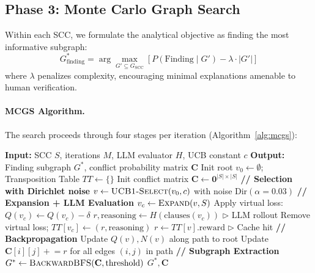 \documentclass{article}
\begin{document}
\subsection{Phase 3: Monte Carlo Graph Search}

Within each SCC, we formulate the analytical objective as finding the most informative subgraph:
\begin{equation}
    G^*_{\text{finding}} = \arg\max_{G' \subseteq G_{\text{SCC}}} \left[ P(\text{Finding} \mid G') - \lambda \cdot |G'| \right]
\end{equation}
where $\lambda$ penalizes complexity, encouraging minimal explanations amenable to human verification.

\paragraph{MCGS Algorithm.} The search proceeds through four stages per iteration (Algorithm~\ref{alg:mcgs}):

\begin{algorithm}[t]
\caption{SA-MCGS: AlphaGo-Style Search for Structural Analysis}
\label{alg:mcgs}
\begin{algorithmic}[1]
\STATE \textbf{Input:} SCC $S$, iterations $M$, LLM evaluator $H$, UCB constant $c$
\STATE \textbf{Output:} Finding subgraph $G^*$, conflict probability matrix $\mathbf{C}$
\STATE Init root $v_0 \leftarrow \emptyset$; Transposition Table $TT \leftarrow \{\}$
\STATE Init conflict matrix $\mathbf{C} \leftarrow \mathbf{0}^{|S| \times |S|}$
    \STATE \textbf{// Selection with Dirichlet noise}
    \STATE $v \leftarrow \textsc{UCB1-Select}(v_0, c)$ with noise $\text{Dir}(\alpha = 0.03)$
        \STATE \textbf{// Expansion + LLM Evaluation}
        \STATE $v_c \leftarrow \textsc{Expand}(v, S)$
        \STATE Apply virtual loss: $Q(v_c) \leftarrow Q(v_c) - \delta$
        \STATE $r, \text{reasoning} \leftarrow H(\text{clauses}(v_c))$ \hfill $\triangleright$ LLM rollout
        \STATE Remove virtual loss; $TT[v_c] \leftarrow (r, \text{reasoning})$
    \ELSE
        \STATE $r \leftarrow TT[v].\text{reward}$ \hfill $\triangleright$ Cache hit
    \ENDIF
    \STATE \textbf{// Backpropagation}
    \STATE Update $Q(v), N(v)$ along path to root
    \STATE Update $\mathbf{C}[i][j] \mathrel{+}= r$ for all edges $(i,j)$ in path
\ENDFOR
\STATE \textbf{// Subgraph Extraction}
\STATE $G^* \leftarrow \textsc{BackwardBFS}(\mathbf{C}, \text{threshold})$
\RETURN $G^*, \mathbf{C}$
\end{algorithmic}
\end{algorithm}
\end{document}
